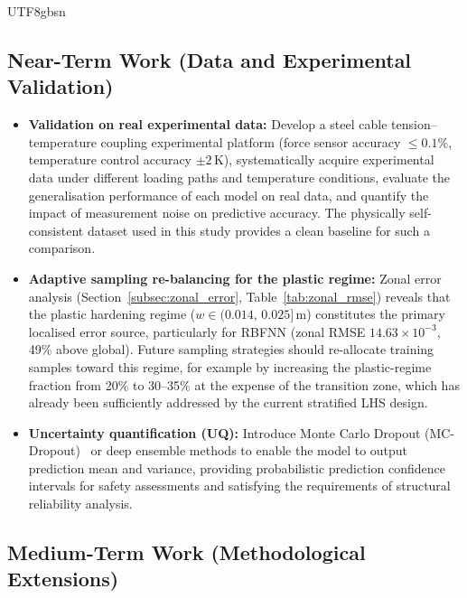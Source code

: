 \documentclass[a4paper,12pt]{report}
\begin{document}
\begin{CJK}{UTF8}{gbsn}
\subsection{Near-Term Work (Data and Experimental Validation)}
\label{subsec:future_near}

\begin{itemize}
  \item \textbf{Validation on real experimental data:} Develop a steel cable
    tension--temperature coupling experimental platform (force sensor accuracy $\leq 0.1\%$,
    temperature control accuracy $\pm 2$\,K), systematically acquire experimental data
    under different loading paths and temperature conditions, evaluate the generalisation
    performance of each model on real data, and quantify the impact of measurement noise
    on predictive accuracy. The physically self-consistent dataset used in this study
    provides a clean baseline for such a comparison.
  \item \textbf{Adaptive sampling re-balancing for the plastic regime:} Zonal error
    analysis (Section~\ref{subsec:zonal_error}, Table~\ref{tab:zonal_rmse}) reveals
    that the plastic hardening regime ($w \in (0.014,\,0.025]$\,m) constitutes the
    primary localised error source, particularly for RBFNN (zonal RMSE
    $14.63 \times 10^{-3}$, 49\% above global). Future sampling strategies should
    re-allocate training samples toward this regime, for example by increasing the
    plastic-regime fraction from 20\% to 30--35\% at the expense of the transition
    zone, which has already been sufficiently addressed by the current stratified
    LHS design.
  \item \textbf{Uncertainty quantification (UQ):} Introduce Monte Carlo Dropout
    (MC-Dropout)~\cite{gal2016dropout} or deep ensemble methods to enable the model to output prediction mean
    and variance, providing probabilistic prediction confidence intervals for safety
    assessments and satisfying the requirements of structural reliability analysis.
\end{itemize}

\subsection{Medium-Term Work (Methodological Extensions)}
\label{subsec:future_medium}


\end{CJK}
\end{document}
